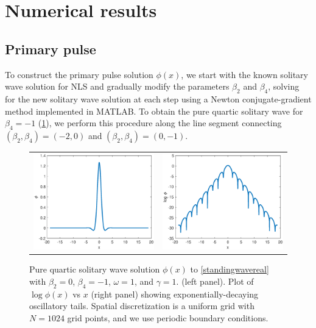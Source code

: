 \documentclass[12pt]{elsarticle}
\begin{document}
\section{Numerical results}

\subsection{Primary pulse}

To construct the primary pulse solution $\phi(x)$, we start with the known solitary wave solution for NLS and gradually modify the parameters $\beta_2$ and $\beta_4$, solving for the new solitary wave solution at each step using a Newton conjugate-gradient method \cite[Chapter 7.2.4]{YangCh7} implemented in MATLAB. To obtain the pure quartic solitary wave for $\beta_4 = -1$ (\cref{fig:PQS}), we perform this procedure along the line segment connecting $(\beta_2, \beta_4) = (-2, 0)$ and $(\beta_2, \beta_4) = (0, -1)$.
\begin{figure}[H]
\centering
\begin{tabular}{cc}
\includegraphics[width=8cm]{images/PQS1.eps} &
\includegraphics[width=8cm]{images/PQS1log.eps}
\end{tabular}
\caption{Pure quartic solitary wave solution $\phi(x)$ to \cref{standingwavereal} with $\beta_2 = 0$, $\beta_4 = -1$, $\omega = 1$, and $\gamma = 1$. (left panel). Plot of $\log \phi(x)$ vs $x$ (right panel) showing exponentially-decaying oscillatory tails. Spatial discretization is a uniform grid with $N = 1024$ grid points, and we use periodic boundary conditions. }
\label{fig:PQS}
\end{figure} 
\end{document}

